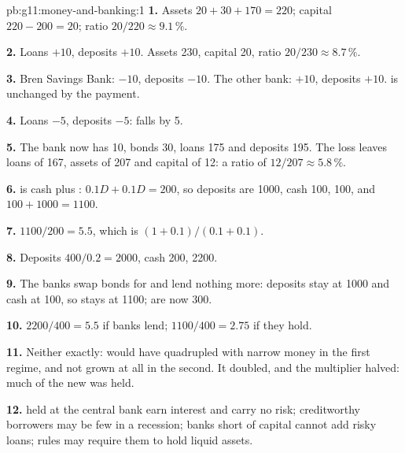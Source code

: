 \begin{solution}{pb:g11:money-and-banking:1}
\textbf{1.} Assets $20 + 30 + 170 = 220$; capital $220 - 200 = 20$; ratio $20/220 \approx 9.1\,\%$.

\textbf{2.} Loans $+10$, deposits $+10$. Assets 230, capital 20, ratio $20/230 \approx 8.7\,\%$.

\textbf{3.} Bren Savings Bank:  $-10$, deposits $-10$. The other bank:  $+10$, deposits $+10$.  is unchanged by the payment.

\textbf{4.} Loans $-5$, deposits $-5$:  falls by 5.

\textbf{5.} The bank now has  10, bonds 30, loans 175 and deposits 195. The loss leaves loans of 167, assets of 207 and capital of 12: a ratio of
$12/207 \approx 5.8\,\%$.

\textbf{6.}  is cash plus : $0.1D + 0.1D = 200$, so deposits are 1000, cash 100,  100, and  $100 + 1000 = 1100$.

\textbf{7.} $1100/200 = 5.5$, which is $(1 + 0.1)/(0.1 + 0.1)$.

\textbf{8.} Deposits $400/0.2 = 2000$, cash 200,  2200.

\textbf{9.} The banks swap bonds for  and lend nothing more: deposits stay at 1000 and cash at 100, so  stays at 1100;  are now 300.

\textbf{10.} $2200/400 = 5.5$ if banks lend; $1100/400 = 2.75$ if they hold.

\textbf{11.} Neither exactly:  would have quadrupled with narrow money in the first regime, and not grown at all in the second. It doubled, and the multiplier
halved: much of the new  was held.

\textbf{12.}  held at the central bank earn interest and carry no risk; creditworthy borrowers may be few in a recession; banks short of capital cannot add risky
loans; rules may require them to hold liquid assets.


\end{solution}

